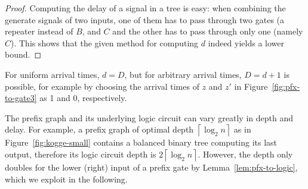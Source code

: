 \documentclass[11pt,final,microtype]{scrartcl}
\theoremstyle{plain}
\theoremstyle{definition}
\theoremstyle{remark}
\newcommand{\ceil}[1]{\left\lceil #1 \right\rceil}
\newcommand{\ld}{\log_{2}}
\begin{document}
\begin{proof}
  Computing the delay of a signal in a tree is easy: when combining
  the generate signals of two inputs, one of them has to pass through
  two gates (a repeater instead of $B$, and $C$ and the other has to
  pass through only one (namely $C$). This shows that the given method
  for computing $d$ indeed yields a lower bound.
\end{proof}
For uniform arrival times, $d = D$, but for arbitrary arrival times,
$D = d+1$ is possible, for example by choosing the arrival times of
$z$ and $z'$ in Figure~\ref{fig:pfx-to-gate3} as 1 and 0, respectively. 

The prefix graph and its underlying logic circuit can
vary greatly in depth and delay. For example, a prefix graph of
optimal depth $\ceil{\ld n}$ as in Figure~\ref{fig:kogge-small}
contains a balanced binary tree computing its last output, therefore
its logic circuit depth is $2\ceil{\ld n}$. However, the depth only
doubles for the lower (right) input of a prefix gate by
Lemma~\ref{lem:pfx-to-logic}, which we exploit in the following.
\end{document}
